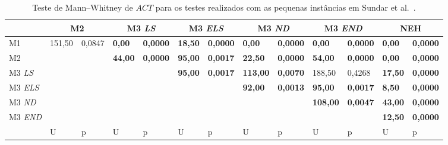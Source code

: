 \begin{table}[H]
\caption{Teste de Mann–Whitney de $ACT$ para os testes realizados com as pequenas instâncias em Sundar et al.~\cite{sundarHybridArtificialBee2017}.}
\label{tab:P2_hipothesis_ACT}
\setlength{\tabcolsep}{3pt} %
\begin{tabular}{l|ll|ll|ll|ll|ll|ll}
                                 & \multicolumn{2}{c|}{M2} & \multicolumn{2}{c|}{M3 \textit{LS}} & \multicolumn{2}{c|}{M3 \textit{ELS}} & \multicolumn{2}{c|}{M3 \textit{ND}} & \multicolumn{2}{c|}{M3 \textit{END}} & \multicolumn{2}{c}{NEH}          \\ \hline
M1                               & 151,50     & 0,0847     & \textbf{0,00}            & \textbf{0,0000}           & \textbf{18,50}            & \textbf{0,0000}           & \textbf{0,00}             & \textbf{0,0000}          & \textbf{0,00}             & \textbf{0,0000}           & \textbf{0,00}  & \textbf{0,0000} \\
M2                               & \textbf{}  & \textbf{}  & \textbf{44,00}           & \textbf{0,0000}           & \textbf{95,00}            & \textbf{0,0017}           & \textbf{22,50}            & \textbf{0,0000}          & \textbf{54,00}            & \textbf{0,0000}           & \textbf{0,00}  & \textbf{0,0000} \\
M3 \textit{LS}  & \textbf{}  & \textbf{}  & \textbf{}                & \textbf{}                 & \textbf{95,00}            & \textbf{0,0017}           & \textbf{113,00}           & \textbf{0,0070}          & 188,50                    & 0,4268                    & \textbf{17,50} & \textbf{0,0000} \\
M3 \textit{ELS} & \textbf{}  & \textbf{}  & \textbf{}                & \textbf{}                 & \textbf{}                 & \textbf{}                 & \textbf{92,00}            & \textbf{0,0013}          & \textbf{95,00}            & \textbf{0,0017}           & \textbf{8,50}  & \textbf{0,0000} \\
M3 \textit{ND}  & \textbf{}  & \textbf{}  & \textbf{}                & \textbf{}                 & \textbf{}                 & \textbf{}                 & \textbf{}                 & \textbf{}                & \textbf{108,00}           & \textbf{0,0047}           & \textbf{43,00} & \textbf{0,0000} \\
M3 \textit{END} & \textbf{}  & \textbf{}  & \textbf{}                & \textbf{}                 & \textbf{}                 & \textbf{}                 & \textbf{}                 & \textbf{}                & \textbf{}                 & \textbf{}                 & \textbf{12,50} & \textbf{0,0000} \\ \hline
                                 & U          & p          & U                        & p                         & U                         & p                         & U                         & p                        & U                         & p                         & U              & p              
\end{tabular}
\end{table}

